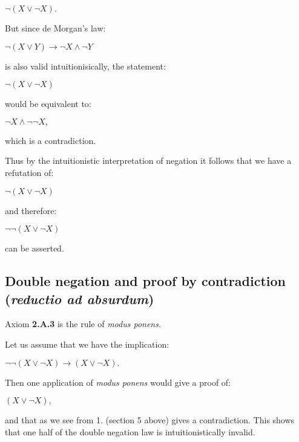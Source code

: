\documentclass[12pt]{article}
\begin{document}
\begin{center}
$\neg (X \vee \neg X).$
\end{center}

But since de Morgan's law:

\begin{center}
$\neg (X \vee Y) \rightarrow \neg X \wedge \neg Y$
\end{center}

is also valid intuitionisically, the statement:

\begin{center}
$\neg (X \vee \neg X)$
\end{center}

would be equivalent to:

\begin{center}
$\neg X \wedge \neg \neg X,$
\end{center}

which is a contradiction.

Thus by the intuitionistic interpretation of negation it follows that we have a refutation of:

\begin{center}
$\neg (X \vee \neg X)$
\end{center}

and therefore:

\begin{center}
$\neg \neg (X \vee \neg X)$
\end{center}

can be asserted.

\subsection{Double negation and proof by contradiction (\emph{reductio ad absurdum})}

Axiom \textbf{2.A.3} is the rule of \emph{modus ponens}.

Let us assume that we have the implication:

\begin{center}
$\neg \neg (X \vee \neg X) \rightarrow (X \vee \neg X).$
\end{center}

Then one application of \emph{modus ponens} would give a proof of:

\begin{center}
$(X \vee \neg X),$
\end{center}

and that as we see from 1. (section 5 above) gives a contradiction. This shows that one half of the double negation law is intuitionistically invalid.
\end{document}
